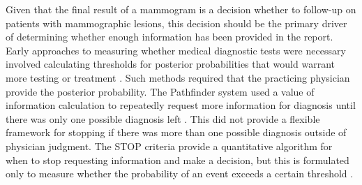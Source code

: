 Given that the final result of a mammogram is a decision whether to follow-up on patients with mammographic lesions, this decision should be the primary driver of determining whether enough information has been provided in the report. Early approaches to measuring whether medical diagnostic tests were necessary involved calculating thresholds for posterior probabilities that would warrant more testing or treatment \cite{Pauker:1980cg}. Such methods required that the practicing physician provide the posterior probability. The Pathfinder system used a value of information calculation to repeatedly request more information for diagnosis until there was only one possible diagnosis left \cite{Heckerman:1992uq}. This did not provide a flexible framework for stopping if there was more than one possible diagnosis outside of physician judgment. The STOP criteria provide a quantitative algorithm for when to stop requesting information and make a decision, but this is formulated only to measure whether the probability of an event exceeds a certain threshold \cite{Gaag:2011gs}.